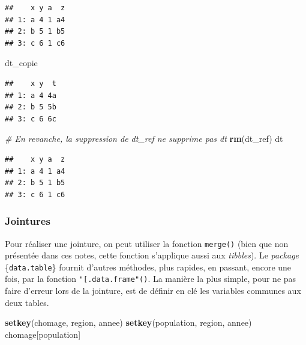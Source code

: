 \documentclass[
  11pt,
]{book}
\newenvironment{Shaded}{\begin{snugshade}}{\end{snugshade}}
\newcommand{\CommentTok}[1]{\textcolor[rgb]{0.56,0.35,0.01}{\textit{#1}}}
\newcommand{\KeywordTok}[1]{\textcolor[rgb]{0.13,0.29,0.53}{\textbf{#1}}}
\newcommand{\NormalTok}[1]{#1}
\numberwithin{equation}{section}
\numberwithin{countremarque}{section}
\begin{document}
\begin{lstlisting}
##    x y a  z
## 1: a 4 1 a4
## 2: b 5 1 b5
## 3: c 6 1 c6
\end{lstlisting}

\begin{Shaded}
\begin{Highlighting}[]
\NormalTok{dt\_copie}
\end{Highlighting}
\end{Shaded}

\begin{lstlisting}
##    x y  t
## 1: a 4 4a
## 2: b 5 5b
## 3: c 6 6c
\end{lstlisting}

\begin{Shaded}
\begin{Highlighting}[]
\CommentTok{\# En revanche, la suppression de dt\_ref ne supprime pas dt}
\KeywordTok{rm}\NormalTok{(dt\_ref)}
\NormalTok{dt}
\end{Highlighting}
\end{Shaded}

\begin{lstlisting}
##    x y a  z
## 1: a 4 1 a4
## 2: b 5 1 b5
## 3: c 6 1 c6
\end{lstlisting}

\hypertarget{jointures-1}{%
\subsubsection{Jointures}\label{jointures-1}}

Pour réaliser une jointure, on peut utiliser la fonction \texttt{merge()} (bien que non présentée dans ces notes, cette fonction s'applique aussi aux \emph{tibbles}). Le \emph{package} \{\texttt{data.table}\} fournit d'autres méthodes, plus rapides, en passant, encore une fois, par la fonction \texttt{"{[}.data.frame"()}. La manière la plus simple, pour ne pas faire d'erreur lors de la jointure, est de définir en clé les variables communes aux deux tables.

\begin{Shaded}
\begin{Highlighting}[]
\KeywordTok{setkey}\NormalTok{(chomage, region, annee)}
\KeywordTok{setkey}\NormalTok{(population, region, annee)}
\NormalTok{chomage[population]}
\end{Highlighting}
\end{Shaded}
\end{document}
